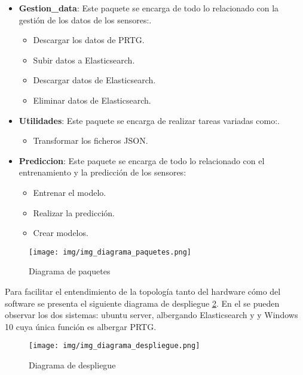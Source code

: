 \begin{itemize}
    \item \textbf{Gestion\_data}: Este paquete se encarga de todo lo relacionado con la gestión de los datos de los sensores:. 
    \begin{itemize}
        \item Descargar los datos de PRTG.
        \item Subir datos a Elasticsearch.
        \item Descargar datos de Elasticsearch.
        \item Eliminar datos de Elasticsearch.
    \end{itemize}
    
    \item \textbf{Utilidades}: Este paquete se encarga de realizar tareas variadas como:.
        \begin{itemize}
            \item Transformar los ficheros JSON.
        \end{itemize}
    \item \textbf{Prediccion}: Este paquete se encarga de todo lo relacionado con el entrenamiento y la predicción de los sensores:
        \begin{itemize}
            \item Entrenar el modelo.
            \item Realizar la predicción.
            \item Crear modelos.
        \end{itemize}
\end{itemize}

\clearpage

\begin{figure}[h]
	\centering
	\texttt{[image: img/img\_diagrama\_paquetes.png]}
	\caption{Diagrama de paquetes}
	\label{img_diagrama_paquetes}
\end{figure}

Para facilitar el entendimiento de la topología tanto del hardware cómo del software se presenta el siguiente diagrama de despliegue \ref{img_diagrama_despliegue}. En el se pueden observar los dos sistemas: ubuntu server, albergando Elasticsearch y \nombrePrograma y Windows 10 cuya única función es albergar PRTG.

\begin{figure}[h]
	\centering
	\texttt{[image: img/img\_diagrama\_despliegue.png]}
	\caption{Diagrama de despliegue}
	\label{img_diagrama_despliegue}
\end{figure}
